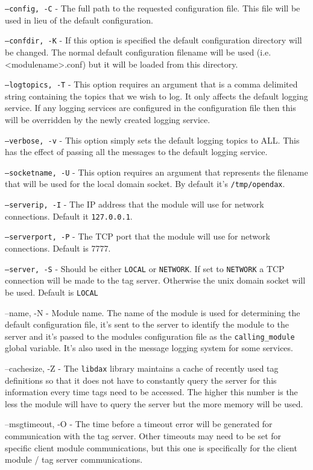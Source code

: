 	\begin{list}{}{Command Line Options}
		\item[\texttt{--config, -C}] - The full path to the requested configuration
		file.  This file will be used in lieu of the default configuration.
		\item[\texttt{--confdir, -K}] - If this option is specified the default
		configuration directory will be changed.  The normal default configuration
		filename will be used (i.e. <modulename>.conf) but it will be loaded from this
		directory.
		\item[\texttt{--logtopics, -T}] - This option requires an argument that is a
		comma delimited string containing the topics that we wish to log.  It only
		affects the default logging service.  If any logging services are configured in
		the configuration file then this will be overridden by the newly created logging
		service.
		\item[\texttt{--verbose, -v}] - This option simply sets the default logging
		topics to ALL.  This has the effect of passing all the messages to the default
		logging service.
		\item[\texttt{--socketname, -U}] - This option requires an argument that
		represents the filename that will be used for the local domain socket.  By
		default it's \texttt{/tmp/opendax}.
		\item[\texttt{--serverip, -I}] - The IP address that the module will use for
		network connections.  Default it \texttt{127.0.0.1}.
		\item[\texttt{--serverport, -P}] - The TCP port that the module will use for
		network connections.  Default is 7777.
		\item[\texttt{--server, -S}] - Should be either \texttt{LOCAL} or
		\texttt{NETWORK}.  If set to \texttt{NETWORK} a TCP connection will be made to
		the tag server.  Otherwise the unix domain socket will be used.  Default is
		\texttt{LOCAL}
		\item[--name, -N] - Module name.  The name of the module is used for
		determining the default configuration file, it's sent to the server to identify
		the module to the server and it's passed to the modules configuration file as
		the \texttt{calling\_module} global variable.  It's also used in the message
		logging system for some services.
		\item[--cachesize, -Z] - The \texttt{libdax} library maintains a cache of
		recently used tag definitions so that it does not have to constantly query the
		server for this information every time tags need to be accessed.  The higher
		this number is the less the module will have to query the server but the more
		memory will be used.
		\item[--msgtimeout, -O] - The time before a timeout error will be generated for
		communication with the tag server.  Other timeouts may need to be set for
		specific client module communications, but this one is specifically for the
		client module / tag server communications.
	\end{list}

